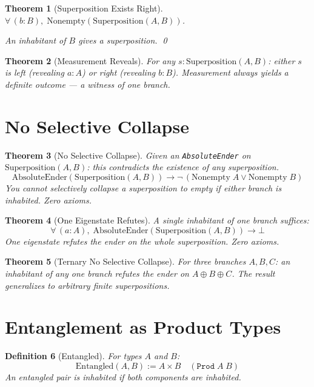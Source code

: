 \documentclass[12pt,a4paper]{article}
\newtheorem{theorem}{Theorem}[section]
\newtheorem{definition}[theorem]{Definition}
\begin{document}
\begin{theorem}[Superposition Exists Right]\label{thm:right}
$\forall\, (b : B),\; \text{Nonempty}(\text{Superposition}(A, B))$.

An inhabitant of $B$ gives a superposition. \qed
\end{theorem}

\begin{theorem}[Measurement Reveals]\label{thm:measure}
For any $s : \text{Superposition}(A, B)$: either $s$ is left (revealing
$a : A$) or right (revealing $b : B$). Measurement always yields a
definite outcome --- a witness of one branch.
\end{theorem}

\section{No Selective Collapse}

\begin{theorem}[No Selective Collapse]\label{thm:nocollapse}
Given an \texttt{AbsoluteEnder} on $\text{Superposition}(A, B)$:
this contradicts the existence of any superposition.
\[
\text{AbsoluteEnder}(\text{Superposition}(A, B)) \to
\neg\, (\text{Nonempty}\; A \lor \text{Nonempty}\; B)
\]
You cannot selectively collapse a superposition to empty if either
branch is inhabited. Zero axioms.
\end{theorem}

\begin{theorem}[One Eigenstate Refutes]\label{thm:one}
A single inhabitant of one branch suffices:
\[
\forall\, (a : A),\; \text{AbsoluteEnder}(\text{Superposition}(A, B)) \to \bot
\]
One eigenstate refutes the ender on the whole superposition. Zero axioms.
\end{theorem}

\begin{theorem}[Ternary No Selective Collapse]\label{thm:ternary}
For three branches $A, B, C$: an inhabitant of any one branch refutes
the ender on $A \oplus B \oplus C$. The result generalizes to arbitrary
finite superpositions.
\end{theorem}

\section{Entanglement as Product Types}

\begin{definition}[Entangled]
For types $A$ and $B$:
\[
\text{Entangled}(A, B) := A \times B \quad (\texttt{Prod}\; A\; B)
\]
An entangled pair is inhabited if both components are inhabited.
\end{definition}
\end{document}
